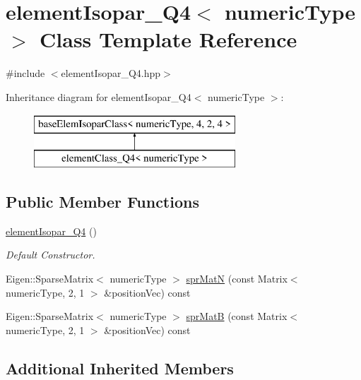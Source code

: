 \hypertarget{classelement_isopar___q4}{}\section{element\+Isopar\+\_\+\+Q4$<$ numeric\+Type $>$ Class Template Reference}
\label{classelement_isopar___q4}


{\ttfamily \#include $<$element\+Isopar\+\_\+\+Q4.\+hpp$>$}

Inheritance diagram for element\+Isopar\+\_\+\+Q4$<$ numeric\+Type $>$\+:\begin{figure}[H]
\begin{center}
\leavevmode
\includegraphics[height=2.000000cm]{classelement_isopar___q4}
\end{center}
\end{figure}
\subsection*{Public Member Functions}
\begin{DoxyCompactItemize}
\item 
\mbox{\label{classelement_isopar___q4_ac3a11de857e7a1bc565bf4052e857c7f}} 
\mbox{\hyperlink{classelement_isopar___q4_ac3a11de857e7a1bc565bf4052e857c7f}{element\+Isopar\+\_\+\+Q4}} ()
\begin{DoxyCompactList}\small\item\em Default Constructor. \end{DoxyCompactList}\item 
Eigen\+::\+Sparse\+Matrix$<$ numeric\+Type $>$ \mbox{\hyperlink{classelement_isopar___q4_a0ebddfb8cbe82e5ab5593ca9c8f3e95e}{spr\+MatN}} (const Matrix$<$ numeric\+Type, 2, 1 $>$ \&position\+Vec) const
\item 
Eigen\+::\+Sparse\+Matrix$<$ numeric\+Type $>$ \mbox{\hyperlink{classelement_isopar___q4_a31ed84f904a48d20dac99efe4137d2b2}{spr\+MatB}} (const Matrix$<$ numeric\+Type, 2, 1 $>$ \&position\+Vec) const
\end{DoxyCompactItemize}
\subsection*{Additional Inherited Members}



